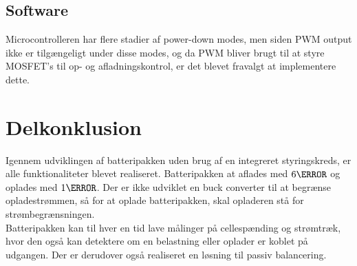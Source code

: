 \subsection{Software}
Microcontrolleren har flere stadier af power-down modes, men siden PWM output ikke er tilgængeligt under disse modes, og da PWM bliver brugt til at styre MOSFET's til op- og afladningskontrol, er det blevet fravalgt at implementere dette. 

\section{Delkonklusion}
Igennem udviklingen af batteripakken uden brug af en integreret styringskreds, er alle funktionaliteter blevet realiseret. Batteripakken at aflades med $6\ampere$ og oplades med $1\ampere$. Der er ikke udviklet en buck converter til at begrænse opladestrømmen, så for at oplade batteripakken, skal opladeren stå for strømbegrænsningen.
\\

Batteripakken kan til hver en tid lave målinger på cellespænding og strømtræk, hvor den også kan detektere om en belastning eller oplader er koblet på udgangen. Der er derudover også realiseret en løsning til passiv balancering.